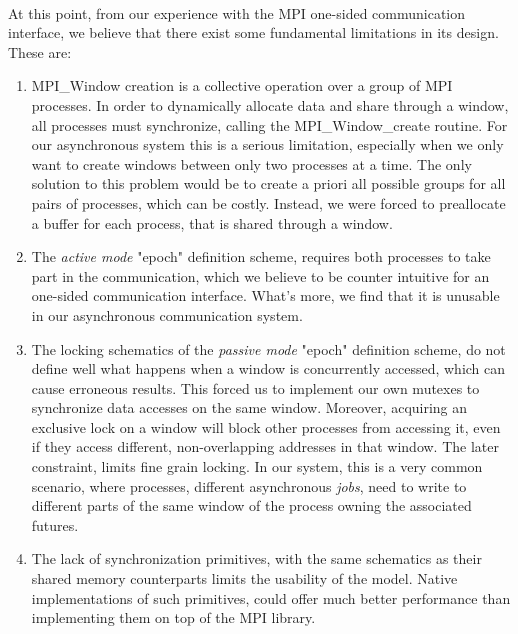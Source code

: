 \paragraph{}
At this point, from our experience with the MPI one-sided communication interface, we believe that there exist
some fundamental limitations in its design. These are:
\\
\begin{enumerate}
	\item MPI\_Window creation is a collective operation over a group of MPI processes.  In order to dynamically
				allocate data and share through a window, all processes must synchronize, calling the MPI\_Window\_create
				routine.  For our asynchronous system this is a serious limitation, especially when we only want to create
				windows between only two processes at a time.  The only solution to this problem would be to create a priori
				all possible groups for all pairs of processes, which can be costly.  Instead, we were forced to preallocate
				a buffer for each process, that is shared through a window.
	
	\item The \emph{active mode} "epoch" definition scheme, requires both processes to take part in the communication,
				which we believe to be counter intuitive for an one-sided communication interface. What's more, we find that
				it is unusable in our asynchronous communication system.

	\item The locking schematics of the \emph{passive mode} "epoch" definition scheme, do not define well what happens
				when a window is concurrently accessed, which can cause erroneous results.  This forced us to implement our
				own mutexes to synchronize data accesses on the same window.  Moreover, acquiring an exclusive lock on a 
				window will block other processes from accessing it, even if they access different, non-overlapping addresses
				in that window.  The later constraint, limits fine grain locking.  In our system, this is a very common
				scenario, where processes, different asynchronous \emph{jobs}, need to write to different parts of the same
		 		window of the process owning the associated futures.

	\item The lack of synchronization primitives, with the same schematics as their shared memory counterparts 
				limits the usability of the model.  Native implementations of such primitives, could offer much better
				performance than implementing them on top of the MPI library.   
\\
\end{enumerate}

